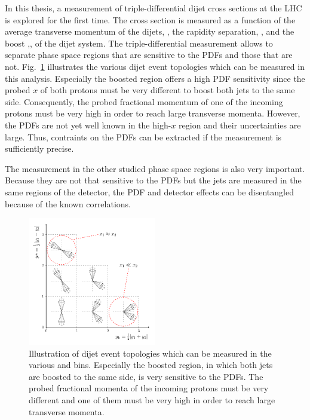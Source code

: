In this thesis, a measurement of triple-differential dijet cross sections at the
LHC is explored for the first time. The cross section is measured as a function
of the average transverse momentum of the dijets, \ptavg, the rapidity
separation, \ystar, and the boost ,\yboost, of the dijet system. The
triple-differential measurement allows to separate phase space regions that are
sensitive to the PDFs and those that are not. Fig.~\ref{fig:intro_ybys_hint}
illustrates the various dijet event topologies which can be measured in this
analysis. Especially the boosted region offers a high PDF sensitivity since the
probed $x$ of both protons must be very different to boost both jets to the same
side. Consequently, the probed fractional momentum of one of the incoming
protons must be very high in order to reach large transverse momenta. However,
the PDFs are not yet well known in the high-$x$ region and their uncertainties
are large. Thus, contraints on the PDFs can be extracted if the measurement is sufficiently precise.

The measurement in the other studied phase space regions is also very important.
Because they are not that sensitive to the PDFs but the jets are measured in the same
regions of the detector, the PDF and detector effects can be disentangled
because of the known correlations.

\begin{figure}
    \centering
    \caption[Illustration of dijet topologies various \ystar and \yboost bins]{
             Illustration of dijet event topologies which can be measured in
             the various \ystar and \yboost bins. Especially the boosted region,
             in which both jets are boosted to the same side, is very sensitive to the PDFs. 
             The probed fractional momenta of the incoming protons must be very
             different and one of them must be very high in order to reach large
             transverse momenta.}
    \label{fig:intro_ybys_hint}
    \includegraphics[width=0.5\textwidth]{figures/drawings/ybys_hint.pdf}
\end{figure}

